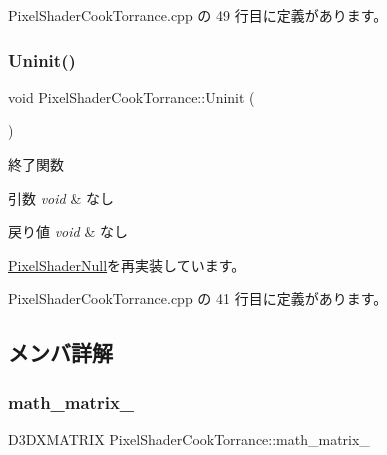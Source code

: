  Pixel\+Shader\+Cook\+Torrance.\+cpp の 49 行目に定義があります。

\mbox{\label{class_pixel_shader_cook_torrance_af2af86383b1724d1bf1364533a07fc5a}} 
\subsubsection{\texorpdfstring{Uninit()}{Uninit()}}
{\footnotesize\ttfamily void Pixel\+Shader\+Cook\+Torrance\+::\+Uninit (\begin{DoxyParamCaption}{ }\end{DoxyParamCaption})\hspace{0.3cm}{\ttfamily [virtual]}}



終了関数 


\begin{DoxyParams}{引数}
{\em void} & なし \\
\hline
\end{DoxyParams}

\begin{DoxyRetVals}{戻り値}
{\em void} & なし \\
\hline
\end{DoxyRetVals}


\mbox{\hyperlink{class_pixel_shader_null_adca4c44cd25c90a5ebd75b459f5e641e}{Pixel\+Shader\+Null}}を再実装しています。



 Pixel\+Shader\+Cook\+Torrance.\+cpp の 41 行目に定義があります。



\subsection{メンバ詳解}
\mbox{\label{class_pixel_shader_cook_torrance_ab23e34b701369457f0c2f63b414228c2}} 
\subsubsection{\texorpdfstring{math\+\_\+matrix\+\_\+}{math\_matrix\_}}
{\footnotesize\ttfamily D3\+D\+X\+M\+A\+T\+R\+IX Pixel\+Shader\+Cook\+Torrance\+::math\+\_\+matrix\+\_\+\hspace{0.3cm}{\ttfamily [private]}}



